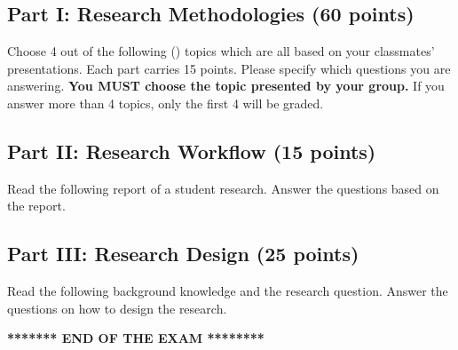\documentclass[12pt]{article}
\begin{document}
\clearpage
\setcounter{page}{1}
\subsection*{Part I: Research Methodologies (60 points)}
Choose 4 out of the following () topics which are all based on your classmates' presentations. Each part carries 15 points. Please specify which questions you are answering. \textbf{You MUST choose the topic presented by your group.} If you answer more than 4 topics, only the first 4 will be graded.


\subsection*{Part II: Research Workflow (15 points)}
Read the following report of a student research. Answer the questions based on the report.

\subsection*{Part III: Research Design (25 points)}
Read the following background knowledge and the research question. Answer the questions on how to design the research.

\begin{center}
    \textbf{\Large ******** END OF THE EXAM ********}
\end{center}
\end{document}
